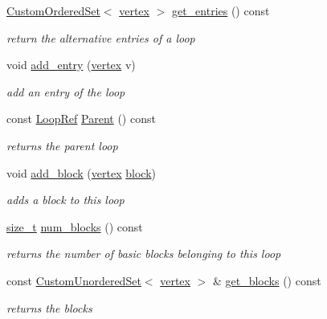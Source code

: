 \begin{DoxyCompactItemize}
\hyperlink{classCustomOrderedSet}{Custom\+Ordered\+Set}$<$ \hyperlink{graph_8hpp_abefdcf0544e601805af44eca032cca14}{vertex} $>$ \hyperlink{classLoop_a37b08e99215e79a65e6d6e07b717eead}{get\+\_\+entries} () const
\begin{DoxyCompactList}\small\item\em return the alternative entries of a loop \end{DoxyCompactList}\item 
void \hyperlink{classLoop_a5f15cc1bd67e9d5fd074785d8b766328}{add\+\_\+entry} (\hyperlink{graph_8hpp_abefdcf0544e601805af44eca032cca14}{vertex} v)
\begin{DoxyCompactList}\small\item\em add an entry of the loop \end{DoxyCompactList}\item 
const \hyperlink{loop_8hpp_aa4a60313089619376f67557c4120423c}{Loop\+Ref} \hyperlink{classLoop_a4c564266a0ffeecb0d251db9263d5946}{Parent} () const
\begin{DoxyCompactList}\small\item\em returns the parent loop \end{DoxyCompactList}\item 
void \hyperlink{classLoop_adc20c1c81f5707afaefe4a02e2b186eb}{add\+\_\+block} (\hyperlink{graph_8hpp_abefdcf0544e601805af44eca032cca14}{vertex} \hyperlink{structblock}{block})
\begin{DoxyCompactList}\small\item\em adds a block to this loop \end{DoxyCompactList}\item 
\hyperlink{tutorial__fpt__2017_2intro_2sixth_2test_8c_a7c94ea6f8948649f8d181ae55911eeaf}{size\+\_\+t} \hyperlink{classLoop_aa9eaa0a85c8edd71ab63481878e2c799}{num\+\_\+blocks} () const
\begin{DoxyCompactList}\small\item\em returns the number of basic blocks belonging to this loop \end{DoxyCompactList}\item 
const \hyperlink{classCustomUnorderedSet}{Custom\+Unordered\+Set}$<$ \hyperlink{graph_8hpp_abefdcf0544e601805af44eca032cca14}{vertex} $>$ \& \hyperlink{classLoop_a2d02ea941387f0fa9efde20f4a812070}{get\+\_\+blocks} () const
\begin{DoxyCompactList}\small\item\em returns the blocks \end{DoxyCompactList}\item 

\end{DoxyCompactItemize}
